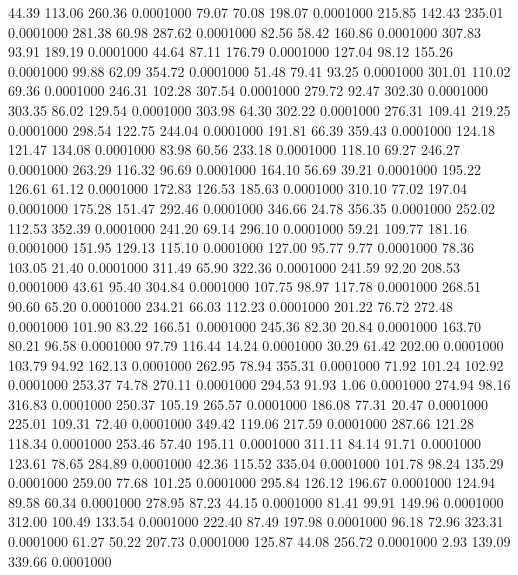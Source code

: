   44.39  113.06  260.36   0.0001000
  79.07   70.08  198.07   0.0001000
 215.85  142.43  235.01   0.0001000
 281.38   60.98  287.62   0.0001000
  82.56   58.42  160.86   0.0001000
 307.83   93.91  189.19   0.0001000
  44.64   87.11  176.79   0.0001000
 127.04   98.12  155.26   0.0001000
  99.88   62.09  354.72   0.0001000
  51.48   79.41   93.25   0.0001000
 301.01  110.02   69.36   0.0001000
 246.31  102.28  307.54   0.0001000
 279.72   92.47  302.30   0.0001000
 303.35   86.02  129.54   0.0001000
 303.98   64.30  302.22   0.0001000
 276.31  109.41  219.25   0.0001000
 298.54  122.75  244.04   0.0001000
 191.81   66.39  359.43   0.0001000
 124.18  121.47  134.08   0.0001000
  83.98   60.56  233.18   0.0001000
 118.10   69.27  246.27   0.0001000
 263.29  116.32   96.69   0.0001000
 164.10   56.69   39.21   0.0001000
 195.22  126.61   61.12   0.0001000
 172.83  126.53  185.63   0.0001000
 310.10   77.02  197.04   0.0001000
 175.28  151.47  292.46   0.0001000
 346.66   24.78  356.35   0.0001000
 252.02  112.53  352.39   0.0001000
 241.20   69.14  296.10   0.0001000
  59.21  109.77  181.16   0.0001000
 151.95  129.13  115.10   0.0001000
 127.00   95.77    9.77   0.0001000
  78.36  103.05   21.40   0.0001000
 311.49   65.90  322.36   0.0001000
 241.59   92.20  208.53   0.0001000
  43.61   95.40  304.84   0.0001000
 107.75   98.97  117.78   0.0001000
 268.51   90.60   65.20   0.0001000
 234.21   66.03  112.23   0.0001000
 201.22   76.72  272.48   0.0001000
 101.90   83.22  166.51   0.0001000
 245.36   82.30   20.84   0.0001000
 163.70   80.21   96.58   0.0001000
  97.79  116.44   14.24   0.0001000
  30.29   61.42  202.00   0.0001000
 103.79   94.92  162.13   0.0001000
 262.95   78.94  355.31   0.0001000
  71.92  101.24  102.92   0.0001000
 253.37   74.78  270.11   0.0001000
 294.53   91.93    1.06   0.0001000
 274.94   98.16  316.83   0.0001000
 250.37  105.19  265.57   0.0001000
 186.08   77.31   20.47   0.0001000
 225.01  109.31   72.40   0.0001000
 349.42  119.06  217.59   0.0001000
 287.66  121.28  118.34   0.0001000
 253.46   57.40  195.11   0.0001000
 311.11   84.14   91.71   0.0001000
 123.61   78.65  284.89   0.0001000
  42.36  115.52  335.04   0.0001000
 101.78   98.24  135.29   0.0001000
 259.00   77.68  101.25   0.0001000
 295.84  126.12  196.67   0.0001000
 124.94   89.58   60.34   0.0001000
 278.95   87.23   44.15   0.0001000
  81.41   99.91  149.96   0.0001000
 312.00  100.49  133.54   0.0001000
 222.40   87.49  197.98   0.0001000
  96.18   72.96  323.31   0.0001000
  61.27   50.22  207.73   0.0001000
 125.87   44.08  256.72   0.0001000
   2.93  139.09  339.66   0.0001000
